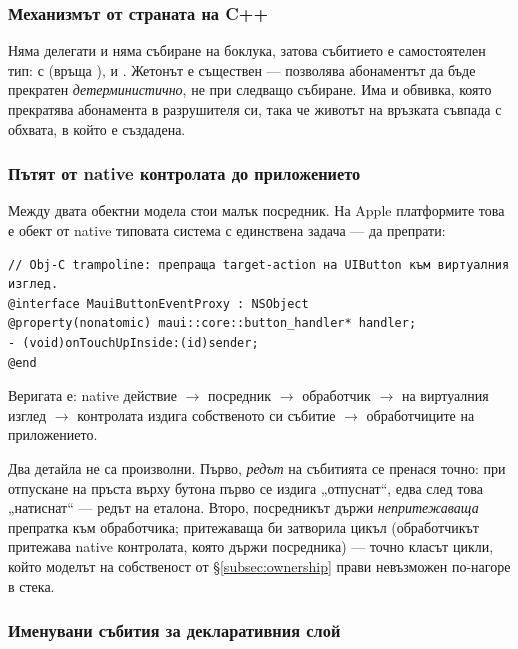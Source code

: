 \subsubsection{Механизмът от страната на C++}

Няма делегати и няма събиране на боклука, затова събитието е самостоятелен тип:
 с  (връща ),  и
. Жетонът е съществен --- позволява абонаментът да бъде прекратен
\emph{детерминистично}, не при следващо събиране. Има и обвивка, която прекратява
абонамента в разрушителя си, така че животът на връзката съвпада с обхвата, в който е
създадена.

\subsubsection{Пътят от native контролата до приложението}

Между двата обектни модела стои малък посредник. На Apple платформите това е обект от native
типовата система с единствена задача --- да препрати:

\begin{lstlisting}[caption={Посредник, който препраща native действието към виртуалния изглед},
  label={lst:event_proxy}, basicstyle=\scriptsize\ttfamily]
// Obj-C trampoline: препраща target-action на UIButton към виртуалния изглед.
@interface MauiButtonEventProxy : NSObject
@property(nonatomic) maui::core::button_handler* handler;
- (void)onTouchUpInside:(id)sender;
@end
\end{lstlisting}

Веригата е: native действие $\rightarrow$ посредник $\rightarrow$ обработчик $\rightarrow$
 на виртуалния изглед $\rightarrow$ контролата издига собственото си
събитие $\rightarrow$ обработчиците на приложението.

Два детайла не са произволни. Първо, \emph{редът} на събитията се пренася точно: при
отпускане на пръста върху бутона първо се издига „отпуснат“, едва след това „натиснат“ ---
редът на еталона. Второ, посредникът държи \emph{непритежаваща} препратка към обработчика;
притежаваща би затворила цикъл (обработчикът притежава native контролата, която държи
посредника) --- точно класът цикли, който моделът на собственост от §\ref{subsec:ownership}
прави невъзможен по-нагоре в стека.

\subsubsection{Именувани събития за декларативния слой}

